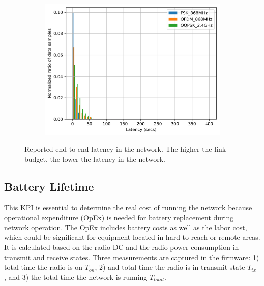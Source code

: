 \documentclass[journal,article,submit,moreauthors,pdftex]{Definitions/mdpi}
\begin{document}
\begin{figure}
\begin{subfigure}{0.6\columnwidth}
        \label{fig:latency_cdf}
	\end{subfigure}%
    ~ 
	\begin{subfigure}{0.6\columnwidth}
		\centering
	\includegraphics[width=1\columnwidth]{latency_pdf}
	\label{fig:latency_pdf}
	\end{subfigure}%

	\caption{Reported end-to-end latency in the network. The higher the link budget, the lower the latency in the network.} 
	\label{fig:latency_all}
\end{figure}

\subsection{Battery Lifetime}
\label{sec:battery_lifetime}


This KPI is essential to determine the real cost of running the network because operational expenditure (OpEx) is needed for battery replacement during network operation. 
The OpEx includes battery costs as well as the labor cost, which could be significant for equipment located in hard-to-reach or remote areas. 
It is calculated based on the radio DC and the radio power consumption in transmit and receive states. 
Three measurements are captured in the firmware: 1) total time the radio is on $T_{on}$, 2) and total time the radio is in transmit state $T_{tx}$ , and 3) the total time the network is running $T_{total}$. 
\end{document}
